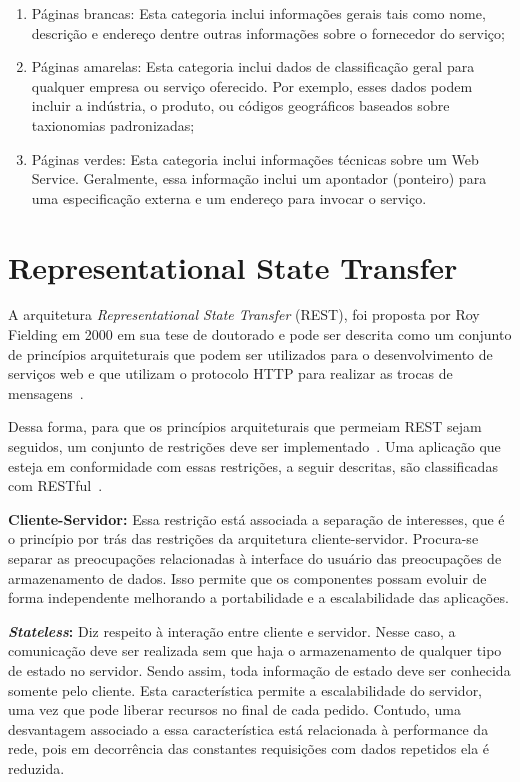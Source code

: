 \begin{enumerate}[a )]
	\item Páginas brancas: Esta categoria inclui informações gerais tais como nome, descrição e endereço dentre outras informações sobre o fornecedor do serviço;

	\item Páginas amarelas: Esta categoria inclui dados de classificação geral para qualquer empresa ou serviço oferecido. Por exemplo, esses dados podem incluir a indústria, o produto, ou códigos geográficos baseados sobre taxionomias padronizadas;

	\item Páginas verdes: Esta categoria inclui informações técnicas sobre um Web Service. Geralmente, essa informação inclui um apontador (ponteiro) para uma especificação externa e um endereço para invocar o serviço.

\end{enumerate}

\section{Representational State Transfer}\label{sec:rest}
A arquitetura \emph{Representational State Transfer} (REST), foi proposta por Roy Fielding em
2000 em sua tese de doutorado e pode ser descrita como um conjunto de princípios arquiteturais que podem ser utilizados para o desenvolvimento de serviços web e que utilizam o protocolo HTTP para realizar as trocas de mensagens~\cite{Fielding2000}.

Dessa forma, para que os princípios arquiteturais que permeiam REST sejam seguidos, um conjunto de restrições deve ser implementado~\cite{Fielding2000}. Uma aplicação que esteja em conformidade com essas restrições, a seguir descritas, são classificadas com RESTful~\cite{Richardson2007}.

\textbf{Cliente-Servidor:} Essa restrição está associada a separação de interesses, que é o princípio por trás das restrições da arquitetura cliente-servidor. Procura-se separar as preocupações relacionadas à interface do usuário das preocupações de armazenamento de dados. Isso permite que os componentes possam evoluir de forma independente melhorando a portabilidade e a escalabilidade das aplicações.

\textbf{\emph{Stateless}:} Diz respeito à interação entre cliente e servidor. Nesse caso, a  comunicação deve ser realizada sem que haja o armazenamento de qualquer tipo de estado no servidor. Sendo assim,  toda informação de estado deve ser conhecida somente pelo cliente.  Esta característica permite a escalabilidade do servidor, uma vez que pode liberar recursos no final de cada pedido.
Contudo, uma desvantagem associado a essa característica  está relacionada à performance da rede, pois em decorrência das constantes requisições com dados repetidos  ela é reduzida.

